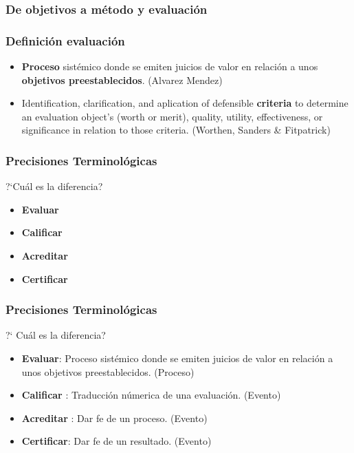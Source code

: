 \documentclass{beamer}
\begin{document}
\begin{frame}
\frametitle{De objetivos a m\'etodo y evaluaci\'on}
\begin{center}
\end{center}
\end{frame}


\begin{frame}
\frametitle{Definici\'on evaluaci\'on}
\begin{center}
\begin{itemize}
\item \textbf{Proceso} sist\'emico donde se emiten juicios de valor en relaci\'on a unos \textbf{objetivos preestablecidos}. (Alvarez Mendez)\\
\item Identification, clarification, and aplication of defensible \textbf{criteria} to determine an evaluation object's (worth or merit), quality, utility, effectiveness, or significance in relation to those criteria. (Worthen, Sanders \& Fitpatrick) 
\end{itemize}
\end{center}
\end{frame}

\begin{frame}
\frametitle{Precisiones Terminol\'ogicas}
\begin{block}
{?`Cu\'al es la diferencia?}
\begin{itemize}
\item \textbf{Evaluar}
\item \textbf{Calificar} 
\item \textbf{Acreditar} 
\item \textbf{Certificar}
\end{itemize}
\end{block}
\end{frame}

\begin{frame}
\frametitle{Precisiones Terminol\'ogicas}
\begin{block}{?` Cu\'al es la diferencia? }
\begin{itemize}
\item \textbf{Evaluar}: Proceso sist\'emico donde se emiten juicios de valor en relaci\'on a unos objetivos preestablecidos. (Proceso)
\item \textbf{Calificar} : Traducci\'on n\'umerica de una evaluaci\'on. (Evento)
\item \textbf{Acreditar} : Dar fe de un proceso. (Evento)
\item \textbf{Certificar}: Dar fe de un resultado. (Evento)
\end{itemize}
\end{block}
\end{frame}
\end{document}
